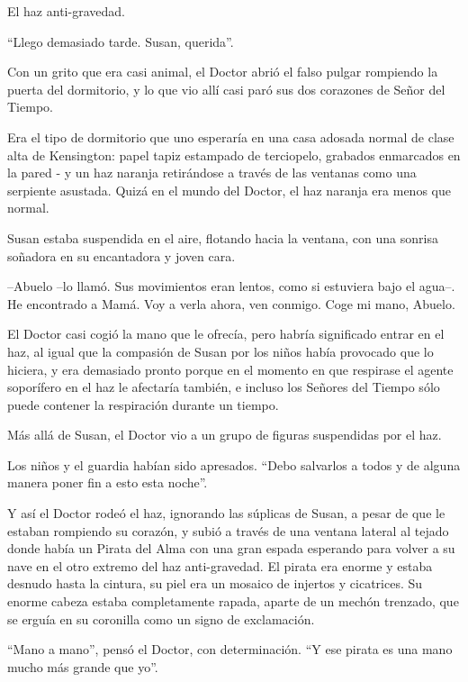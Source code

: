 El haz anti-gravedad.
 
``Llego demasiado tarde. Susan, querida''.
 
Con un grito que era casi animal, el Doctor abrió el falso pulgar rompiendo la puerta del dormitorio, y lo que vio allí casi paró sus dos corazones de Señor del Tiempo.
 
Era el tipo de dormitorio que uno esperaría en una casa adosada normal de clase alta de Kensington: papel tapiz estampado de terciopelo, grabados enmarcados en la pared - y un haz naranja retirándose a través de las ventanas como una serpiente asustada. Quizá en el mundo del Doctor, el haz naranja era menos que normal.
 
Susan estaba suspendida en el aire, flotando hacia la ventana, con una sonrisa soñadora en su encantadora y joven cara.
 
--Abuelo --lo llamó. Sus movimientos eran lentos, como si estuviera bajo el agua--. He encontrado a Mamá. Voy a verla ahora, ven conmigo. Coge mi mano, Abuelo.
 
El Doctor casi cogió la mano que le ofrecía, pero habría significado entrar en el haz, al igual que la compasión de Susan por los niños había provocado que lo hiciera, y era demasiado pronto porque en el momento en que respirase el agente soporífero en el haz le afectaría también, e incluso los Señores del Tiempo sólo puede contener la respiración durante un tiempo.
 
Más allá de Susan, el Doctor vio a un grupo de figuras suspendidas por el haz.
 
Los niños y el guardia habían sido apresados. ``Debo salvarlos a todos y de alguna manera poner fin a esto esta noche''.
 
Y así el Doctor rodeó el haz, ignorando las súplicas de Susan, a pesar de que le estaban rompiendo su corazón, y subió a través de una ventana lateral al tejado donde había un Pirata del Alma con una gran espada esperando para volver a su nave en el otro extremo del haz anti-gravedad. El pirata era enorme y estaba desnudo hasta la cintura, su piel era un mosaico de injertos y cicatrices. Su enorme cabeza estaba completamente rapada, aparte de un mechón trenzado, que se erguía en su coronilla como un signo de exclamación.
 
``Mano a mano'', pensó el Doctor, con determinación. ``Y ese pirata es una mano mucho más grande que yo''.